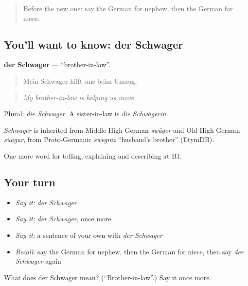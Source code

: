 \label{lesson:GE-C489-schwager}



\begin{quote}
Before the new one: say the German for nephew, then the German for niece.
\end{quote}

\subsection*{You'll want to know: der Schwager}
\textbf{der Schwager} — \textquotedblleft{}brother-in-law\textquotedblright{}.

\begin{quote}
Mein Schwager hilft uns beim Umzug.
\end{quote}

\begin{quote}
\emph{My brother-in-law is helping us move.}
\end{quote}

Plural: \emph{die Schwager}. A sister-in-law is \emph{die Schwägerin}.

\begin{cousinweb}
\emph{Schwager} is inherited from Middle High German \emph{swāger} and Old High German \emph{suāgur}, from Proto-Germanic \emph{swēgraz} \textquotedblleft{}husband's brother\textquotedblright{} (EtymDB).
\end{cousinweb}

\begin{grammarlens}[title={What you've built}]
One more word for telling, explaining and describing at B1.
\end{grammarlens}

\subsection*{Your turn}
\begin{itemize}
\raggedright
  \item \emph{Say it:} \emph{der Schwager}
  \item \emph{Say it:} \emph{der Schwager}, once more
  \item \emph{Say it:} a sentence of your own with \emph{der Schwager}
  \item \emph{Recall:} say the German for nephew, then the German for niece, then say \emph{der Schwager} again
\end{itemize}

\begin{tcolorbox}[breakable,colback=teal!4,colframe=teal!35!black,title={Before you move on}]
What does der Schwager mean? (\textquotedblleft{}Brother-in-law\textquotedblright{}.) Say it once more.
\end{tcolorbox}
